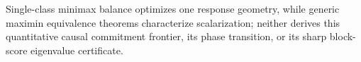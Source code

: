 Single-class minimax balance optimizes one response geometry, while generic maximin equivalence theorems characterize scalarization; neither derives this quantitative causal commitment frontier, its phase transition, or its sharp block-score eigenvalue certificate.